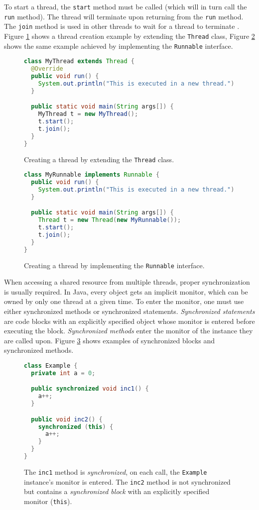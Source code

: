 To start a thread, the \texttt{start} method must be called (which will in
turn call the \texttt{run} method). The thread will terminate upon returning
from the \texttt{run} method. The \texttt{join} method is used in other
threads to wait for a thread to terminate \cite{javaTheCompleteReference}.
Figure \ref{threadExtend} shows a thread creation example by extending the
\texttt{Thread} class, Figure \ref{threadRunnable} shows the same example
achieved by implementing the \texttt{Runnable} interface.

\begin{figure}[hbt]
    \label{threadExtend}
\begin{lstlisting}[language=java]
class MyThread extends Thread {
  @Override
  public void run() {
    System.out.println("This is executed in a new thread.");
  }

  public static void main(String args[]) {
    MyThread t = new MyThread();
    t.start();
    t.join();
  }
}
\end{lstlisting}
    \caption{Creating a thread by extending the \texttt{Thread} class.}
\end{figure}

\begin{figure}[hbt]
    \label{threadRunnable}
\begin{lstlisting}[language=java]
class MyRunnable implements Runnable {
  public void run() {
    System.out.println("This is executed in a new thread.");
  }

  public static void main(String args[]) {
    Thread t = new Thread(new MyRunnable());
    t.start();
    t.join();
  }
}
\end{lstlisting}
    \caption{Creating a thread by implementing the \texttt{Runnable} interface.}
\end{figure}

When accessing a shared resource from multiple threads, proper synchronization
is usually required. In Java, every object gets an implicit monitor, which can
be owned by only one thread at a given time. To enter the monitor, one must use
either synchronized methods or synchronized statements.  \emph{Synchronized
statements} are code blocks with an explicitly specified object whose monitor is
entered before executing the block. \emph{Synchronized methods} enter the
monitor of the instance they are called upon. Figure \ref{synchronized} shows
examples of synchronized blocks and synchronized methods.

\begin{figure}[hbt]
    \label{synchronized}
\begin{lstlisting}[language=java]
class Example {
  private int a = 0;

  public synchronized void inc1() {
    a++;
  }

  public void inc2() {
    synchronized (this) {
      a++;
    }
  }
}
\end{lstlisting}
    \caption{The \texttt{inc1} method is \emph{synchronized}, on each call, the
    \texttt{Example} instance's monitor is entered. The \texttt{inc2} method is
    not synchronized but contains a \emph{synchronized block} with an explicitly
    specified monitor (\texttt{this}).}
\end{figure}

